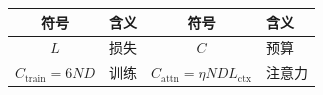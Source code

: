 \documentclass[12pt]{ctexart}
\newcommand{\Dt}{D}
\newcommand{\Lctx}{L_{\mathrm{ctx}}}
\newcommand{\Ctrain}{C_{\mathrm{train}}}
\newcommand{\Cattn}{C_{\mathrm{attn}}}
\begin{document}
\begin{table}[h]\centering\small
\begin{tabular}{clcl}
\toprule
符号 & 含义 & 符号 & 含义 \\
\midrule
$L$ & 损失 & $C$ & 预算 \\
$\Ctrain=6N\Dt$ & 训练 & $\Cattn=\eta N\Dt\Lctx$ & 注意力 \\
\bottomrule
\end{tabular}
\end{table}
\end{document}
